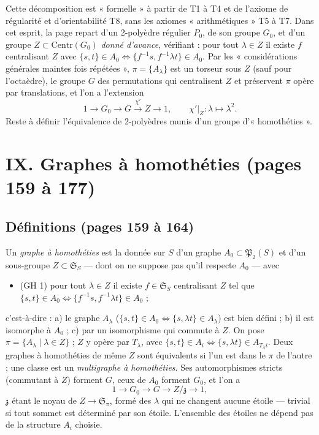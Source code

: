 \documentclass[11pt,a4paper]{article}
\begin{document}
Cette décomposition est « formelle » à partir de T1 à T4 et de l'axiome de
régularité et d'orientabilité T8, sans les axiomes « arithmétiques » T5 à T7.
Dans cet esprit, la page repart d'un 2-polyèdre régulier $P_0$, de son groupe
$G_0$, et d'un groupe $Z \subset \mathrm{Centr}(G_0)$ \emph{donné d'avance},
vérifiant : pour tout $\lambda \in Z$ il existe $f$ centralisant $Z$ avec $\{s,
t\} \in A_0 \iff \{f^{-1}s, f^{-1}\lambda t\} \in A_0$. Par les
« considérations générales maintes fois répétées », $\pi = \{A_\lambda\}$ est un
torseur sous $Z$ (sauf pour l'octaèdre), le groupe $G$ des permutations qui
centralisent $Z$ et préservent $\pi$ opère par translations, et l'on a
l'extension
\[
  1 \longrightarrow G_0 \longrightarrow G \xrightarrow{\ \chi'\ } Z
  \longrightarrow 1 , \qquad \chi'|_Z : \lambda \mapsto \lambda^2 .
\]
Reste à définir l'équivalence de 2-polyèdres munis d'un groupe d'« homothéties ».

\section*{IX. Graphes à homothéties (pages 159 à 177)}

\subsection*{Définitions (pages 159 à 164)}

Un \emph{graphe à homothéties} est la donnée sur $S$ d'un graphe $A_0 \subset
\mathfrak{P}_2(S)$ et d'un sous-groupe $Z \subset \mathfrak{S}_S$ --- dont on
ne suppose pas qu'il respecte $A_0$ --- avec
\begin{itemize}
  \item (GH 1) pour tout $\lambda \in Z$ il existe $f \in \mathfrak{S}_S$
    centralisant $Z$ tel que $\{s, t\} \in A_0 \iff \{f^{-1}s, f^{-1}\lambda t\}
    \in A_0$ ;
\end{itemize}
c'est-à-dire : a) le graphe $A_\lambda$ ($\{s, t\} \in A_0 \iff \{s, \lambda t\}
\in A_\lambda$) est bien défini ; b) il est isomorphe à $A_0$ ; c) par un
isomorphisme qui commute à $Z$. On pose $\pi = \{A_\lambda \mid \lambda \in
Z\}$ ; $Z$ y opère par $T_\lambda$, avec $\{s, t\} \in A_i \iff \{s, \lambda t\}
\in A_{T_\lambda i}$. Deux graphes à homothéties de même $Z$ sont équivalents
si l'un est dans le $\pi$ de l'autre ; une classe est un \emph{multigraphe à
homothéties}. Ses automorphismes stricts (commutant à $Z$) forment $G$, ceux de
$A_0$ forment $G_0$, et l'on a
\[
  1 \longrightarrow G_0 \longrightarrow G \longrightarrow Z/\mathfrak{z}
  \longrightarrow 1 ,
\]
$\mathfrak{z}$ étant le noyau de $Z \to \mathfrak{S}_\pi$, formé des $\lambda$
qui ne changent aucune étoile --- trivial si tout sommet est déterminé par son
étoile. L'ensemble des étoiles ne dépend pas de la structure $A_i$ choisie.
\end{document}

